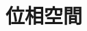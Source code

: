 \documentclass[a5paper]{ltjsbook}
\theoremstyle{mydefinition}
\begin{document}
\chapter{位相空間}


\end{document}
